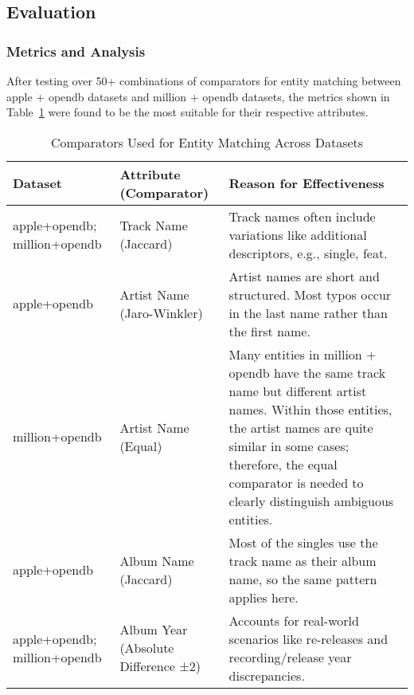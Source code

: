 \documentclass[runningheads]{llncs}
\begin{document}
\subsection{Evaluation}
\subsubsection{Metrics and Analysis}

After testing over 50+ combinations of comparators for entity matching between apple + opendb datasets and million + opendb datasets, the metrics shown in Table~\ref{tab:comparators} were found to be the most suitable for their respective attributes.

\setlength{\tabcolsep}{4pt} %
\renewcommand{\arraystretch}{1.5} %
\begin{table}[ht]
	\centering
	\caption{Comparators Used for Entity Matching Across Datasets}
	\label{tab:comparators}
	\begin{tabular}{p{2.5cm}p{2.5cm}p{6cm}}
	\hline
	\textbf{Dataset}      & \textbf{Attribute (Comparator)}            & \textbf{Reason for Effectiveness}                                                                                      \\ \hline
	apple+opendb; million+opendb & \raggedright Track Name (Jaccard)              & Track names often include variations like additional descriptors, e.g., single, feat.                                  \\ \hline
	apple+opendb                  & \raggedright Artist Name (Jaro-Winkler)                  & Artist names are short and structured. Most typos occur in the last name rather than the first name.                    \\ \hline
	million+opendb                & \raggedright Artist Name (Equal)                          & Many entities in million + opendb have the same track name but different artist names. Within those entities, the artist names are quite similar in some cases; therefore, the equal comparator is needed to clearly distinguish ambiguous entities. \\ \hline
	apple+opendb                  & \raggedright Album Name (Jaccard)              & Most of the singles use the track name as their album name, so the same pattern applies here.                           \\ \hline
	apple+opendb; million+opendb & \raggedright Album Year (Absolute Difference ±2)       & Accounts for real-world scenarios like re-releases and recording/release year discrepancies.                            \\ \hline
	\end{tabular}
	\end{table}
\end{document}
